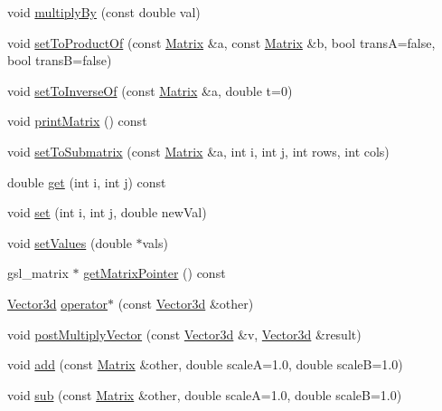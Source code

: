 \begin{DoxyCompactItemize}
\item 
void \hyperlink{classCartWheel_1_1Math_1_1Matrix_a804032859efce36d43e569ed767271b0}{multiplyBy} (const double val)
\item 
void \hyperlink{classCartWheel_1_1Math_1_1Matrix_ac2f4452cecbb5ffdaf6df379229fa22e}{setToProductOf} (const \hyperlink{classCartWheel_1_1Math_1_1Matrix}{Matrix} \&a, const \hyperlink{classCartWheel_1_1Math_1_1Matrix}{Matrix} \&b, bool transA=false, bool transB=false)
\item 
void \hyperlink{classCartWheel_1_1Math_1_1Matrix_aafef0fc884fdf893406fcbf9b69bdee5}{setToInverseOf} (const \hyperlink{classCartWheel_1_1Math_1_1Matrix}{Matrix} \&a, double t=0)
\item 
void \hyperlink{classCartWheel_1_1Math_1_1Matrix_a31515ccb097bdaa77027cb1f315cd713}{printMatrix} () const 
\item 
void \hyperlink{classCartWheel_1_1Math_1_1Matrix_a66059180667b010ff529c2320fee859f}{setToSubmatrix} (const \hyperlink{classCartWheel_1_1Math_1_1Matrix}{Matrix} \&a, int i, int j, int rows, int cols)
\item 
double \hyperlink{classCartWheel_1_1Math_1_1Matrix_aa579c908e6d968b29ed739613ca29d00}{get} (int i, int j) const 
\item 
void \hyperlink{classCartWheel_1_1Math_1_1Matrix_aa33675ee32bcb342a7ed18f9e089b615}{set} (int i, int j, double newVal)
\item 
void \hyperlink{classCartWheel_1_1Math_1_1Matrix_a879b543a840821660d869c820f4528a2}{setValues} (double $\ast$vals)
\item 
gsl\_\-matrix $\ast$ \hyperlink{classCartWheel_1_1Math_1_1Matrix_a38ac405c65b49255f62cf6084fda191a}{getMatrixPointer} () const 
\item 
\hyperlink{classCartWheel_1_1Math_1_1Vector3d}{Vector3d} \hyperlink{classCartWheel_1_1Math_1_1Matrix_ad33238e122583ca44b13197d6f845d91}{operator$\ast$} (const \hyperlink{classCartWheel_1_1Math_1_1Vector3d}{Vector3d} \&other)
\item 
void \hyperlink{classCartWheel_1_1Math_1_1Matrix_a51c6fb9367bb553ad892ab54ed663c59}{postMultiplyVector} (const \hyperlink{classCartWheel_1_1Math_1_1Vector3d}{Vector3d} \&v, \hyperlink{classCartWheel_1_1Math_1_1Vector3d}{Vector3d} \&result)
\item 
void \hyperlink{classCartWheel_1_1Math_1_1Matrix_ad8f3a5082ed8bc533638def9177c5a4e}{add} (const \hyperlink{classCartWheel_1_1Math_1_1Matrix}{Matrix} \&other, double scaleA=1.0, double scaleB=1.0)
\item 
void \hyperlink{classCartWheel_1_1Math_1_1Matrix_a3e3cb8fbb2734f589230dc7914f7b586}{sub} (const \hyperlink{classCartWheel_1_1Math_1_1Matrix}{Matrix} \&other, double scaleA=1.0, double scaleB=1.0)
\end{DoxyCompactItemize}
